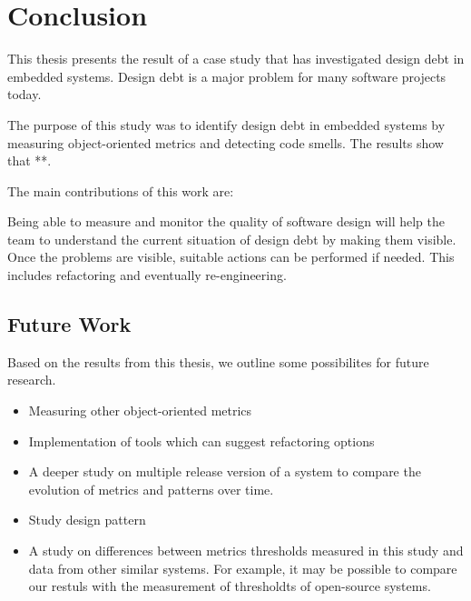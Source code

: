 
\chapter{Conclusion}
This thesis presents the result of a case study that has investigated design debt in embedded systems. Design debt is a major problem for many software projects today. 


The purpose of this study was to identify design debt in embedded systems by measuring object-oriented metrics and detecting code smells. The results show that **. 

The main contributions of this work are:

Being able to measure and monitor the quality of software design will help the team to understand the current situation of design debt by making them visible. Once the problems are visible, suitable actions can be performed if needed. This includes refactoring and eventually re-engineering. 

\section{Future Work}
Based on the results from this thesis, we outline some possibilites for future research.

\begin{itemize}
	\item Measuring other object-oriented metrics
	\item Implementation of tools which can suggest refactoring options
	\item A deeper study on multiple release version of a system to compare the evolution of metrics and patterns over time.
	\item Study design pattern
	\item A study on differences between metrics thresholds measured in this study and data from other similar systems. For example, it may be possible to compare our restuls with the measurement of thresholdts of open-source systems. 
\end{itemize}
